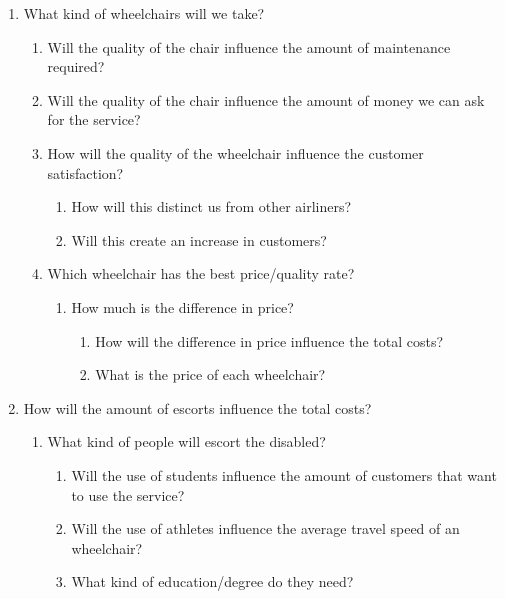 \documentclass[a4paper, 12pt, notitlepage]{report}
\begin{document}
\begin{enumerate}
\begin{enumerate}
	\end{enumerate}
\item What kind of wheelchairs will we take?
	\begin{enumerate}
	\item Will the quality of the chair influence the amount of maintenance required?
	\item Will the quality of the chair influence the amount of money we can ask for the service?
	\item How will the quality of the wheelchair influence the customer satisfaction?
		\begin{enumerate}
		\item How will this distinct us from other airliners?
		\item Will this create an increase in customers?
		\end{enumerate}
	\item Which wheelchair has the best price/quality rate?
		\begin{enumerate}
		\item How much is the difference in price?
			\begin{enumerate}
			\item How will the difference in price influence the total costs?
			\item What is the price of each wheelchair?
			\end{enumerate}
		\end{enumerate}
	\end{enumerate}
\item How will the amount of escorts influence the total costs?
	\begin{enumerate}
	\item What kind of people will escort the disabled?
		\begin{enumerate}
		\item Will the use of students influence the amount of customers that want to use the service?
		\item Will the use of athletes influence the average travel speed of an wheelchair?
		\item What kind of education/degree do they need?


\end{enumerate}
\end{enumerate}
\end{enumerate}
\end{document}
